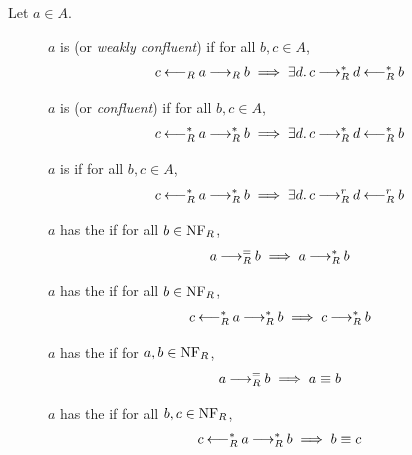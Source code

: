 \begin{definition} Let $a \in A$.
    \begin{description}
        \item[\bq {}] $a$ is  (or \emph{weakly confluent}) if for all $b,c \in A$, \[c \mathbin{\longleftarrow_R} a \mathbin{\longrightarrow_R} b \implies \exists d.\, c \mathbin{\longrightarrow_R^*} d \mathbin{\longleftarrow_R^*} b\]
        \item[\bq {}] $a$ is  (or \emph{confluent}) if for all $b,c \in A$, \[c \mathbin{\longleftarrow_R^*} a \mathbin{\longrightarrow_R^*} b \implies \exists d.\, c \mathbin{\longrightarrow_R^*} d \mathbin{\longleftarrow_R^*} b\]
        \item[\bq {}] $a$ is  if for all $b, c \in A$,
        \[c \mathbin{\longleftarrow_R^*} a \mathbin{\longrightarrow_R^*} b \implies \exists d. \, c \mathbin{\longrightarrow_R^r} d \mathbin{\longleftarrow_R^r} b\]
        \item[\bq {}] $a$ has the  if for all $b \in \mathrm{NF}_R$, \[ a \mathbin{\longrightarrow_R^=} b \implies a\mathbin{\longrightarrow_R^*} b\]
        \item[\bq {}] $a$ has the  if for all $b \in \mathrm{NF}_R$,
        \[c \mathbin{\longleftarrow_R^*} a \mathbin{\longrightarrow_R^*} b \implies c \mathbin{\longrightarrow_R^*} b\]
        \item[\bq {}] $a$ has the  if for $a, b \in \mathrm{NF}_R$, \[a \mathbin{\longrightarrow_R^=} b \implies a \equiv b\]
        \item[\bq {}] $a$ has the  if for all $b, c \in \mathrm{NF}_R$,
        \[c \mathbin{\longleftarrow_R^*} a \mathbin{\longrightarrow_R^*} b  \implies b \equiv c\]
    \end{description}
\end{definition}
